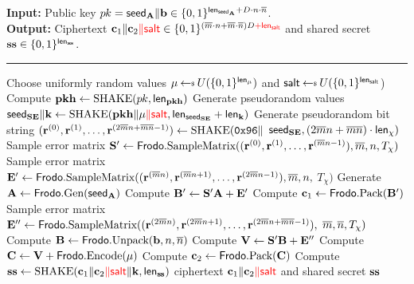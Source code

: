 \documentclass{iacrcc}
\begin{document}
\begin{algorithm}[H]
\caption{\label{alg:KEM:Encaps} $\FrodoKEM.\Encaps$.}
{\bf Input:} Public key $\pk = \seedA\| \bfb \in \{0,1\}^{\lengthseedA + D\cdot n \cdot \nbar}$.\\
{\bf Output:} Ciphertext $\bfc_1\| \bfc_2{\color{red}\| \salt}\in \{0,1\}^{(\mbar\cdot n +\mbar\cdot\nbar)D{\color{red}+\lengthsalt}}$ and shared secret $\ssk \in \{0,1\}^\lengthss$.\\[-1.5ex]
\rule{\linewidth}{.5pt}
\vspace{-0.5cm}
\begin{algorithmic}[1]
    \STATE Choose uniformly random values $\mu \getsr U(\{0,1\}^\lengthm)$ {\color{red}and $\salt \getsr U(\{0,1\}^\lengthsalt$)}
    \STATE Compute $\pkh \gets \SHAKE(\pk, \lengthpkhash)$
    \STATE Generate pseudorandom values $\seedSE\| \bfk \gets \SHAKE(\pkh \| \mu{\color{red}\| \salt}, \lengthseedSE + \lengthK)$
    \STATE Generate pseudorandom bit string $ (\bfr^{(0)}, \bfr^{(1)}, \dots, \bfr^{(2\mbar n+\mbar\nbar-1)}) \gets \SHAKE(\mathtt{0x96} \|$ $\seedSE, (2\mbar n+\mbar\nbar) \cdot \lengthchi)$
    \STATE Sample error matrix $\bfS' \gets \Frodo.\SampV((\bfr^{(0)}, \bfr^{(1)}, \dots, \bfr^{(\mbar n-1)}), \mbar, n, T_\chi)$
    \STATE Sample error matrix $\bfE' \gets \Frodo.\SampV((\bfr^{(\mbar n)}, \bfr^{(\mbar n+1)}, \dots, \bfr^{(2\mbar n-1)}), \mbar, n,$ $T_\chi)$
    \STATE Generate $\bfA\gets \Frodo.\gen(\seedA)$
    \STATE Compute $\bfB' \gets \bfS'\bfA + \bfE'$
    \STATE Compute $\bfc_1 \gets \Frodo.\Pack(\bfB')$
    \STATE Sample error matrix $\bfE'' \gets \Frodo.\SampV((\bfr^{(2\mbar n)}, \bfr^{(2\mbar n+1)}, \dots, \bfr^{(2\mbar n+\mbar\nbar-1)}),$ $\mbar, \nbar, T_\chi)$
    \STATE Compute $\bfB \gets \Frodo.\Unpack(\bfb,n,\nbar)$
    \STATE Compute $\bfV \gets \bfS'\bfB + \bfE''$
    \STATE Compute $\bfC \gets \bfV + \Frodo.\Encode(\mu)$
    \STATE Compute $\bfc_2 \gets \Frodo.\Pack(\bfC)$
    \STATE Compute $\ssk \gets \SHAKE(\bfc_1 \| \bfc_2{\color{red}\| \salt} \| \bfk, \lengthss)$
    \RETURN ciphertext $\bfc_1 \| \bfc_2{\color{red}\| \salt}$ and shared secret $\ssk$
    \end{algorithmic}
\end{algorithm}
\end{document}
